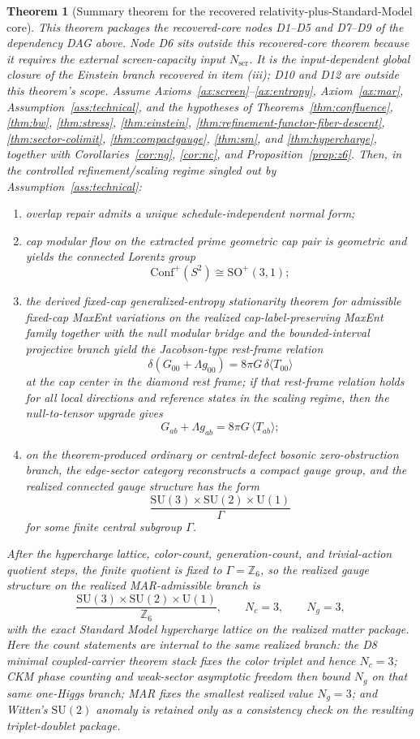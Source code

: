 \documentclass[11pt]{article}
\newtheorem{theorem}{Theorem}[section]
\newcommand{\SU}{\mathrm{SU}}
\newcommand{\U}{\mathrm{U}}
\newcommand{\Conf}{\mathrm{Conf}}
\begin{document}
\begin{theorem}[Summary theorem for the recovered relativity-plus-Standard-Model core]\label{thm:master}
This theorem packages the recovered-core nodes D1--D5 and D7--D9 of the dependency DAG above. Node D6 sits outside this recovered-core theorem because it requires the external screen-capacity input \(N_{\mathrm{scr}}\). It is the input-dependent global closure of the Einstein branch recovered in item (iii); D10 and D12 are outside this theorem's scope. Assume Axioms~\ref{ax:screen}--\ref{ax:entropy}, Axiom~\ref{ax:mar}, Assumption~\ref{ass:technical}, and the hypotheses of Theorems~\ref{thm:confluence}, \ref{thm:bw}, \ref{thm:stress}, \ref{thm:einstein}, \ref{thm:refinement-functor-fiber-descent}, \ref{thm:sector-colimit}, \ref{thm:compactgauge}, \ref{thm:sm}, and \ref{thm:hypercharge}, together with Corollaries~\ref{cor:ng}, \ref{cor:nc}, and Proposition~\ref{prop:z6}. Then, in the controlled refinement/scaling regime singled out by Assumption~\ref{ass:technical}:
\begin{enumerate}[label=(\roman*),leftmargin=2em]
\item overlap repair admits a unique schedule-independent normal form;
\item cap modular flow on the extracted prime geometric cap pair is geometric and yields the connected Lorentz group
\[
\Conf^+(S^2)\cong \mathrm{SO}^+(3,1);
\]
\item the derived fixed-cap generalized-entropy stationarity theorem for admissible fixed-cap MaxEnt variations on the realized cap-label-preserving MaxEnt family together with the null modular bridge and the bounded-interval projective branch yield the Jacobson-type rest-frame relation
\[
\delta\!\left(G_{00}+\Lambda g_{00}\right)=8\pi G\,\delta\langle T_{00}\rangle
\]
at the cap center in the diamond rest frame; if that rest-frame relation holds for all local directions and reference states in the scaling regime, then the null-to-tensor upgrade gives
\[
G_{ab}+\Lambda g_{ab}=8\pi G\,\langle T_{ab}\rangle;
\]
\item on the theorem-produced ordinary or central-defect bosonic zero-obstruction branch, the edge-sector category reconstructs a compact gauge group, and the realized connected gauge structure has the form
\[
\frac{\SU(3)\times\SU(2)\times\U(1)}{\Gamma}
\]
for some finite central subgroup \(\Gamma\).
\end{enumerate}
After the hypercharge lattice, color-count, generation-count, and trivial-action quotient steps, the finite quotient is fixed to \(\Gamma=\mathbb Z_6\), so the realized gauge structure on the realized MAR-admissible branch is
\[
\frac{\SU(3)\times\SU(2)\times\U(1)}{\mathbb Z_6},
\qquad
N_c=3,
\qquad
N_g=3,
\]
with the exact Standard Model hypercharge lattice on the realized matter package. Here the count statements are internal to the same realized branch: the D8 minimal coupled-carrier theorem stack fixes the color triplet and hence \(N_c=3\); CKM phase counting and weak-sector asymptotic freedom then bound \(N_g\) on that same one-Higgs branch; MAR fixes the smallest realized value \(N_g=3\); and Witten's \(\SU(2)\) anomaly is retained only as a consistency check on the resulting triplet-doublet package.
\end{theorem}
\end{document}
